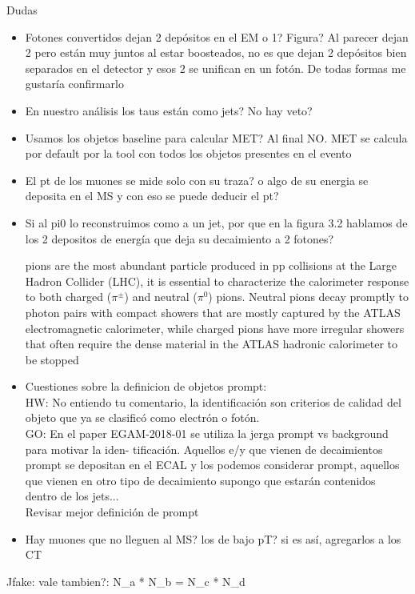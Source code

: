 



{\LARGE Dudas}

\begin{itemize}
	\item Fotones convertidos dejan 2 depósitos en el EM o 1? Figura? Al parecer dejan 2 pero están muy juntos al estar boosteados, no es que dejan 2 depósitos bien separados en el detector y esos 2 se unifican en un fotón. De todas formas me gustaría confirmarlo
	\item En nuestro análisis los taus están como jets? No hay veto?
	\item Usamos los objetos baseline para calcular MET? Al final NO. MET se calcula por default por la tool con todos los objetos presentes en el evento
	\item El pt de los muones se mide solo con su traza? o algo de su energia se deposita en el MS y con eso se puede deducir el pt?
	\item Si al pi0 lo reconstruimos como a un jet, por que en la figura 3.2 hablamos de los 2 depositos de energía que deja su decaimiento a 2 fotones?

	pions are the most abundant particle produced in pp collisions at the Large Hadron Collider
(LHC), it is essential to characterize the calorimeter response to both charged ($\pi^{\pm}$) and neutral ($\pi^{0}$) pions. Neutral pions decay promptly to photon pairs with compact showers that are mostly captured by the
ATLAS electromagnetic calorimeter, while charged pions have more irregular showers that often require
the dense material in the ATLAS hadronic calorimeter to be stopped

	\item Cuestiones sobre la definicion de objetos prompt: \\
	HW: No entiendo tu comentario, la identificación son criterios de calidad del objeto que ya se clasificó como electrón o fotón. \\
	GO: En	el paper EGAM-2018-01 se utiliza la jerga prompt vs background para motivar la iden-
	tificación. Aquellos e/y que vienen de decaimientos prompt se depositan en el ECAL y
	los podemos considerar prompt, aquellos que vienen en otro tipo de decaimiento supongo
	que estarán contenidos dentro de los jets... \\
	Revisar mejor definición de prompt
	\item Hay muones que no lleguen al MS? los de bajo pT? si es así, agregarlos a los CT
\end{itemize}

Jfake:
vale tambien?: N_a * N_b = N_c * N_d
